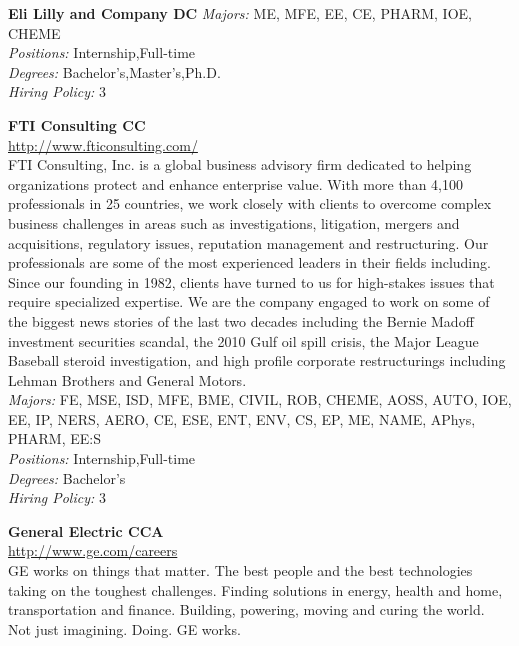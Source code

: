 \documentclass[twoside]{article}
\begin{document}
\begin{center}
\begin{multicols}{2}
\begin{minipage}{.95\columnwidth}{\Large\bf Eli Lilly and Company \hfill DC}
    \emph{Majors:} ME, MFE, EE, CE, PHARM, IOE, CHEME\\
    \emph{Positions:} Internship,Full-time\\
    \emph{Degrees:} Bachelor's,Master's,Ph.D.\\
    \emph{Hiring Policy:} 3\\
\end{minipage}
 \begin{minipage}{.95\columnwidth}{\Large\bf FTI Consulting \hfill CC}\\
    \url{http://www.fticonsulting.com/}\\
    FTI Consulting, Inc. is a global business advisory firm dedicated to helping organizations protect and enhance enterprise value. With more than 4,100 professionals in 25 countries, we work closely with clients to overcome complex business challenges in areas such as investigations, litigation, mergers and acquisitions, regulatory issues, reputation management and restructuring. Our professionals are some of the most experienced leaders in their fields including. Since our founding in 1982, clients have turned to us for high-stakes issues that require specialized expertise. We are the company engaged to work on some of the biggest news stories of the last two decades including the Bernie Madoff investment securities scandal, the 2010 Gulf oil spill crisis, the Major League Baseball steroid investigation, and high profile corporate restructurings including Lehman Brothers and General Motors.\\
    \emph{Majors:} FE, MSE, ISD, MFE, BME, CIVIL, ROB, CHEME, AOSS, AUTO, IOE, EE, IP, NERS, AERO, CE, ESE, ENT, ENV, CS, EP, ME, NAME, APhys, PHARM, EE:S\\
    \emph{Positions:} Internship,Full-time\\
    \emph{Degrees:} Bachelor's\\
    \emph{Hiring Policy:} 3\\
\end{minipage}
 \begin{minipage}{.95\columnwidth}{\Large\bf General Electric \hfill CCA}\\
    \url{http://www.ge.com/careers}\\
    GE works on things that matter. The best people and the best technologies taking on the toughest challenges. Finding solutions in energy, health and home, transportation and finance. Building, powering, moving and curing the world. Not just imagining. Doing. GE works.\\

\end{minipage}
\end{multicols}
\end{center}
\end{document}
